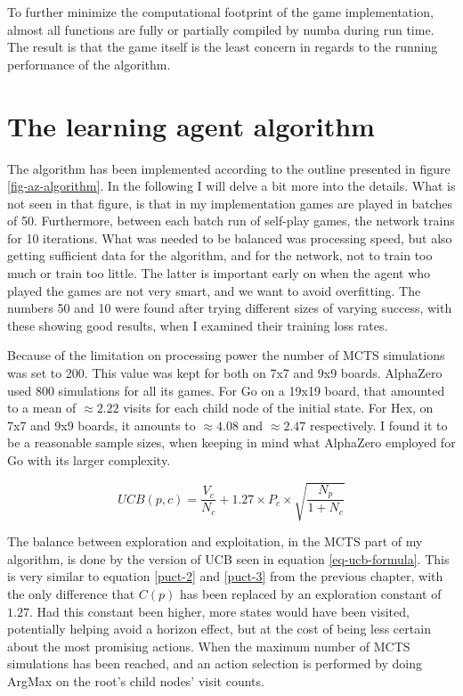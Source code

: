 To further minimize the computational footprint of the game implementation, almost all functions are fully or partially compiled by numba during run time. The result is that the game itself is the least concern in regards to the running performance of the algorithm.

\section{The learning agent algorithm}
The algorithm has been implemented according to the outline presented in figure \ref{fig-az-algorithm}. In the following I will delve a bit more into the details. What is not seen in that figure, is that in my implementation games are played in batches of 50. Furthermore, between each batch run of self-play games, the network trains for 10 iterations. What was needed to be balanced was processing speed, but also getting sufficient data for the algorithm, and for the network, not to train too much or train too little. The latter is important early on when the agent who played the games are not very smart, and we want to avoid overfitting. The numbers 50 and 10 were found after trying different sizes of varying success, with these showing good results, when I examined their training loss rates.

Because of the limitation on processing power the number of MCTS simulations was set to 200. This value was kept for both on 7x7 and 9x9 boards. AlphaZero used 800 simulations for all its games. For Go on a 19x19 board, that amounted to a mean of $\approx 2.22$ visits for each child node of the initial state. For Hex, on 7x7 and 9x9 boards, it amounts to $\approx 4.08$ and $\approx 2.47$ respectively. I found it to be a reasonable sample sizes, when keeping in mind what AlphaZero employed for Go with its larger complexity.

\begin{equation}
UCB(p,c) = \frac{V_c}{N_c} + 1.27\times P_c\times \sqrt{\frac{N_p}{1 + N_c}}
\label{eq-ucb-formula}
\end{equation}

The balance between exploration and exploitation, in the MCTS part of my algorithm, is done by the version of UCB seen in equation \ref{eq-ucb-formula}. This is very similar to equation \ref{puct-2} and \ref{puct-3} from the previous chapter, with the only difference that $C(p)$ has been replaced by an exploration constant of $1.27$. Had this constant been higher, more states would have been visited, potentially helping avoid a horizon effect, but at the cost of being less certain about the most promising actions. When the maximum number of MCTS simulations has been reached, and an action selection is performed by doing ArgMax on the root's child nodes' visit counts.

